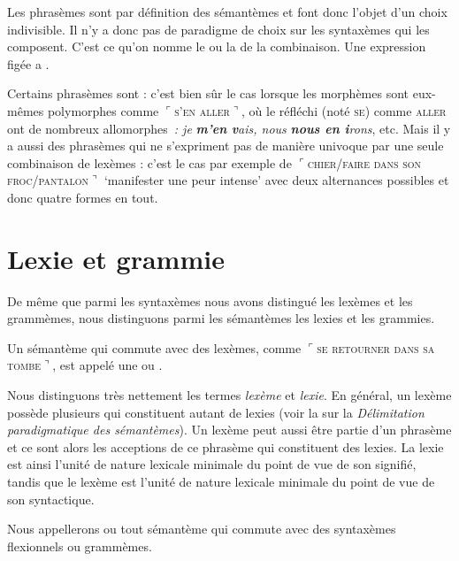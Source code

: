 Les phrasèmes sont par définition des sémantèmes et font donc l’objet d’un choix indivisible. Il n’y a donc pas de paradigme de choix sur les syntaxèmes qui les composent. C’est ce qu’on nomme le  ou la  de la combinaison. Une expression figée a .

Certains phrasèmes sont  : c’est bien sûr le cas lorsque les morphèmes sont eux-mêmes polymorphes comme $⌜$\textsc{s’en} \textsc{aller}$⌝$, où le réfléchi (noté \textsc{se}) comme \textsc{aller} ont de nombreux allomorphes~\textit{: je} \textbf{\textit{m’en} \textit{v}}\textit{ais, nous} \textbf{\textit{nous en i}}\textit{rons}, etc. Mais il y a aussi des phrasèmes qui ne s’expriment pas de manière univoque par une seule combinaison de lexèmes : c’est le cas par exemple de $⌜$\textsc{chier/faire} \textsc{dans} \textsc{son} \textsc{froc/pantalon}$⌝$ ‘manifester une peur intense’ avec deux alternances possibles et donc quatre formes en tout.

\section{Lexie et grammie}\label{sec:2.3.8}%

De même que parmi les syntaxèmes nous avons distingué les lexèmes et les grammèmes, nous distinguons parmi les sémantèmes les lexies et les grammies.

{Un sémantème qui commute avec des lexèmes, comme $⌜$\textsc{se} \textsc{retourner} \textsc{dans} \textsc{sa} \textsc{tombe}$⌝$, est appelé une  ou .}

Nous distinguons très nettement les termes \textit{lexème} et \textit{lexie}. En général, un lexème possède plusieurs  qui constituent autant de lexies (voir la  sur la \textit{Délimitation paradigmatique des sémantèmes}). Un lexème peut aussi être partie d’un phrasème et ce sont alors les acceptions de ce phrasème qui constituent des lexies. La lexie est ainsi l’unité de nature lexicale minimale du point de vue de son signifié, tandis que le lexème est l’unité de nature lexicale minimale du point de vue de son syntactique.

{Nous appellerons  ou  tout sémantème qui commute avec des syntaxèmes flexionnels ou grammèmes.}

